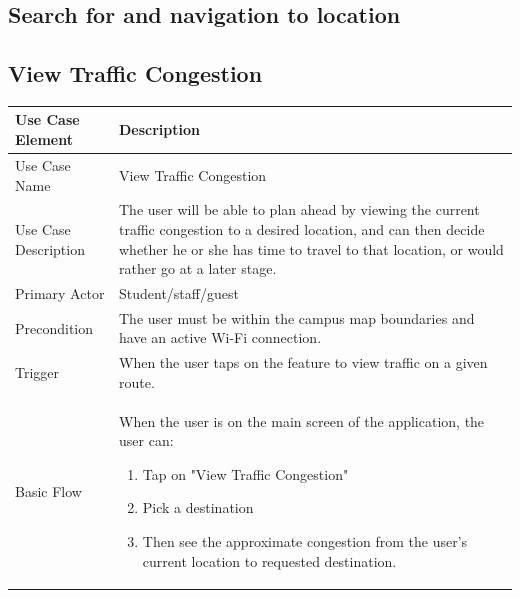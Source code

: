 \documentclass[12pt]{article}
\begin{document}

	
	
	\subsection{Search for and navigation to location}
	
	
	\subsection{View Traffic Congestion}
	\begin{tabular}{|p{4cm}|p{10cm}|}
\hline

Use Case Element & Description \\
\hline

Use Case Name & 
View Traffic Congestion \\
\hline

Use Case Description & 
The user will be able to plan ahead by viewing the current traffic congestion to a desired location, and can then decide whether he or she has time to travel to that location, or would rather go at a later stage.   \\
\hline

Primary Actor & 
Student/staff/guest \\
\hline

Precondition & 
The user must be within the campus map boundaries and have an active Wi-Fi connection.   \\
\hline

Trigger & 
When the user taps on the feature to view traffic on a given route.   \\
\hline

Basic Flow & 
When the user is on the main screen of the application, the user can:
\begin{enumerate}
\item Tap on "View Traffic Congestion"
\item Pick a destination
\item Then see the approximate congestion from the user's current location to requested destination.
\end{enumerate} \\
\hline

\hline
\end{tabular}
\end{document}
